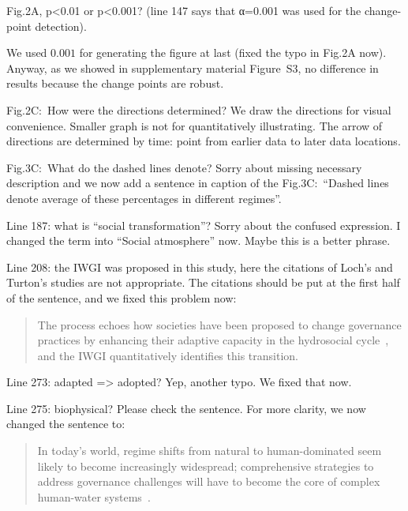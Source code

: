 \RC{} Fig.2A, p<0.01 or p<0.001? (line 147 says that α=0.001 was used for the change-point detection).

\AR{} We used $0.001$ for generating the figure at last (fixed the typo in Fig.2A now). Anyway, as we showed in supplementary material Figure~S3, no difference in results because the change points are robust. %

\RC{} Fig.2C:\ How were the directions determined?
\AR{} We draw the directions for visual convenience. Smaller graph is not for quantitatively illustrating. The arrow of directions are determined by time: point from earlier data to later data locations.

\RC{} Fig.3C:\ What do the dashed lines denote?
\AR{} Sorry about missing necessary description and we now add a sentence in caption of the Fig.3C:\ ``Dashed lines denote average of these percentages in different regimes''.

\RC{} Line 187: what is ``social transformation''?
\AR{} Sorry about the confused expression. I changed the term into ``Social atmosphere'' now. Maybe this is a better phrase.

\RC{} Line 208: the IWGI was proposed in this study, here the citations of Loch's and Turton's studies are not appropriate.
\AR{} The citations should be put at the first half of the sentence, and we fixed this problem now:

\begin{quote}
	The process echoes how societies have been proposed to change governance practices by enhancing their adaptive capacity in the hydrosocial cycle~\cite{loch2020,turton1999}, and the IWGI quantitatively identifies this transition.
\end{quote}

\RC{} Line 273: adapted => adopted?
\AR{} Yep, another typo. We fixed that now.

\RC{} Line 275: biophysical? Please check the sentence.
\AR{} For more clarity, we now changed the sentence to:

\begin{quote}
	In today's world, regime shifts from natural to human-dominated seem likely to become increasingly widespread; comprehensive strategies to address governance challenges will have to become the core of complex human-water systems~\cite{cumming2018,cumming2014,jaeger2019}.
\end{quote}
